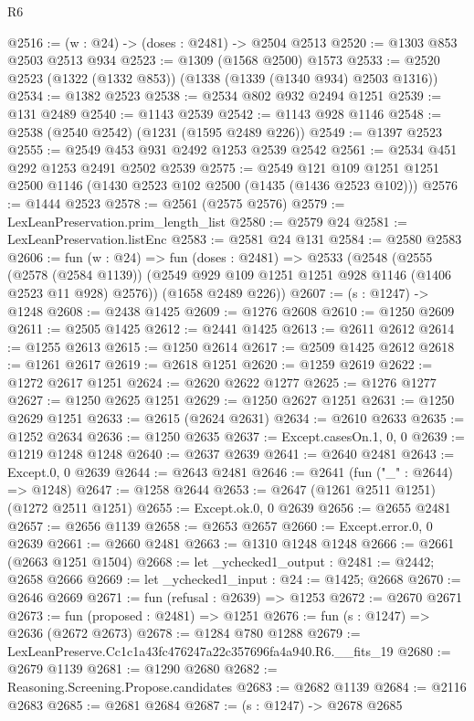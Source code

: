 \begin{lexlean}{R6}
\begin{coremodule}
@2516 := (w : @24) -> (doses : @2481) -> @2504 @2513
@2520 := @1303 @853 @2503 @2513 @934
@2523 := @1309 (@1568 @2500) @1573
@2533 := @2520 @2523 (@1322 (@1332 @853)) (@1338 (@1339 (@1340 @934) @2503 @1316))
@2534 := @1382 @2523
@2538 := @2534 @802 @932 @2494 @1251
@2539 := @131 @2489
@2540 := @1143 @2539
@2542 := @1143 @928 @1146
@2548 := @2538 (@2540 @2542) (@1231 (@1595 @2489 @226))
@2549 := @1397 @2523
@2555 := @2549 @453 @931 @2492 @1253 @2539 @2542
@2561 := @2534 @451 @292 @1253 @2491 @2502 @2539
@2575 := @2549 @121 @109 @1251 @1251 @2500 @1146 (@1430 @2523 @102 @2500 (@1435 (@1436 @2523 @102)))
@2576 := @1444 @2523
@2578 := @2561 (@2575 @2576)
@2579 := LexLeanPreservation.prim_length_list
@2580 := @2579 @24
@2581 := LexLeanPreservation.listEnc
@2583 := @2581 @24 @131
@2584 := @2580 @2583
@2606 := fun (w : @24) =>
  fun (doses : @2481) =>
  @2533
    (@2548
      (@2555
        (@2578 (@2584 @1139))
        (@2549 @929 @109 @1251 @1251 @928 @1146 (@1406 @2523 @11 @928) @2576))
      (@1658 @2489 @226))
@2607 := (s : @1247) -> @1248
@2608 := @2438 @1425
@2609 := @1276 @2608
@2610 := @1250 @2609
@2611 := @2505 @1425
@2612 := @2441 @1425
@2613 := @2611 @2612
@2614 := @1255 @2613
@2615 := @1250 @2614
@2617 := @2509 @1425 @2612
@2618 := @1261 @2617
@2619 := @2618 @1251
@2620 := @1259 @2619
@2622 := @1272 @2617 @1251
@2624 := @2620 @2622 @1277
@2625 := @1276 @1277
@2627 := @1250 @2625 @1251
@2629 := @1250 @2627 @1251
@2631 := @1250 @2629 @1251
@2633 := @2615 (@2624 @2631)
@2634 := @2610 @2633
@2635 := @1252 @2634
@2636 := @1250 @2635
@2637 := Except.casesOn.{1, 0, 0}
@2639 := @1219 @1248 @1248
@2640 := @2637 @2639
@2641 := @2640 @2481
@2643 := Except.{0, 0} @2639
@2644 := @2643 @2481
@2646 := @2641 (fun ("_" : @2644) => @1248)
@2647 := @1258 @2644
@2653 := @2647 (@1261 @2511 @1251) (@1272 @2511 @1251)
@2655 := Except.ok.{0, 0} @2639
@2656 := @2655 @2481
@2657 := @2656 @1139
@2658 := @2653 @2657
@2660 := Except.error.{0, 0} @2639
@2661 := @2660 @2481
@2663 := @1310 @1248 @1248
@2666 := @2661 (@2663 @1251 @1504)
@2668 := let _ychecked1_output : @2481 := @2442; @2658 @2666
@2669 := let _ychecked1_input : @24 := @1425; @2668
@2670 := @2646 @2669
@2671 := fun (refusal : @2639) => @1253
@2672 := @2670 @2671
@2673 := fun (proposed : @2481) => @1251
@2676 := fun (s : @1247) => @2636 (@2672 @2673)
@2678 := @1284 @780 @1288
@2679 := LexLeanPreserve.Cc1c1a43fc476247a22c357696fa4a940.R6.__fits_19
@2680 := @2679 @1139
@2681 := @1290 @2680
@2682 := Reasoning.Screening.Propose.candidates
@2683 := @2682 @1139
@2684 := @2116 @2683
@2685 := @2681 @2684
@2687 := (s : @1247) -> @2678 @2685

\end{coremodule}
\end{lexlean}
